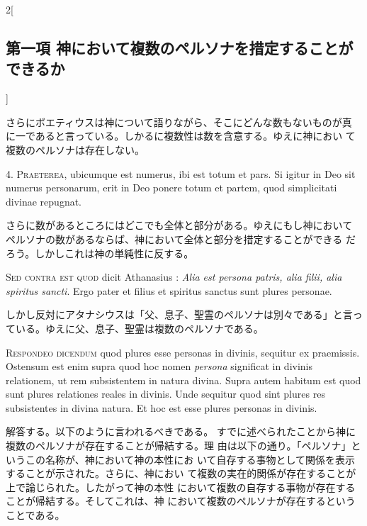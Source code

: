 \documentclass[paper=a4paper,fontsize=10pt,jafontsize=9pt,titlepage]{jlreq}
\begin{document}
\begin{paracol}{2}[\subsection{第一項 神において複数のペルソナを措定することができるか}]
\switchcolumn


さらにボエティウスは神について語りながら、そこにどんな数もないものが真
 に一であると言っている。しかるに複数性は数を含意する。ゆえに神におい
 て複数のペルソナは存在しない。




4. {\scshape Praeterea}, ubicumque est numerus, ibi est totum et pars. Si igitur in
Deo sit numerus personarum, erit in Deo ponere totum et partem, quod
simplicitati divinae repugnat.


\switchcolumn


さらに数があるところにはどこでも全体と部分がある。ゆえにもし神において
 ペルソナの数があるならば、神において全体と部分を措定することができる
 だろう。しかしこれは神の単純性に反する。


\switchcolumn*[\subsection{s.c.}]


{\scshape Sed contra est quod} dicit Athanasius : {\itshape Alia est persona patris, alia
filii, alia spiritus sancti}. Ergo pater et filius et spiritus sanctus
sunt plures personae.


\switchcolumn


しかし反対にアタナシウスは「父、息子、聖霊のペルソナは別々である」と言っ
 ている。ゆえに父、息子、聖霊は複数のペルソナである。




{\scshape Respondeo dicendum} quod plures esse personas in divinis, sequitur ex
praemissis. Ostensum est enim supra quod hoc nomen {\itshape persona} significat
in divinis relationem, ut rem subsistentem in natura divina. Supra
autem habitum est quod sunt plures relationes reales in divinis. Unde
sequitur quod sint plures res subsistentes in divina natura. Et hoc
est esse plures personas in divinis.


\switchcolumn


解答する。以下のように言われるべきである。
すでに述べられたことから神に複数のペルソナが存在することが帰結する。理
 由は以下の通り。「ペルソナ」というこの名称が、神において神の本性にお
 いて自存する事物として関係を表示することが示された。さらに、神におい
 て複数の実在的関係が存在することが上で論じられた。したがって神の本性
 において複数の自存する事物が存在することが帰結する。そしてこれは、神
 において複数のペルソナが存在するということである。



\end{paracol}
\end{document}
